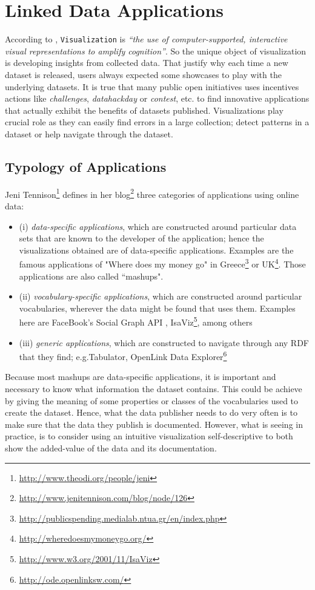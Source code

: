 \section{Linked Data Applications} \label{sec:apps}
According to \cite{card99}, \texttt{Visualization} is \textit{ ``the use of computer-supported, interactive visual representations to amplify cognition''}. So the unique object of visualization is developing insights from collected data. That justify why each time a new dataset is released, users always expected some showcases to play with the underlying datasets. It is true that many public open initiatives uses incentives actions like \textit{challenges}, \textit{datahackday} or \textit{contest}, etc. to find innovative applications that actually exhibit the benefits of datasets published. Visualizations play crucial role as they can easily find errors in a large collection; detect patterns in a dataset or help navigate through the dataset. 

\subsection{Typology of Applications}
Jeni Tennison\footnote{\url{http://www.theodi.org/people/jeni}} defines  in her blog\footnote{\url{http://www.jenitennison.com/blog/node/126}} three categories of applications using online data:
\begin{itemize}
\item (i) \textit{data-specific applications}, which are constructed around particular data sets that are known to the developer of the application; hence the visualizations obtained are of data-specific applications. Examples are the famous applications of "Where does my money go"  in Greece\footnote{\url{http://publicspending.medialab.ntua.gr/en/index.php}} or UK\footnote{\url{http://wheredoesmymoneygo.org/}}. Those applications are also called ``mashups". 
\item (ii) \textit{vocabulary-specific applications}, which are constructed around particular vocabularies, wherever the data might be found that uses them. Examples here are FaceBook’s Social Graph API , IsaViz\footnote{\url{http://www.w3.org/2001/11/IsaViz}}, among others
\item (iii) \textit{generic applications}, which are constructed to navigate through any RDF that they find; e.g.Tabulator\cite{tabulator06}, OpenLink Data Explorer\footnote{\url{http://ode.openlinksw.com/}}

\end{itemize}
Because most mashups are data-specific applications, it is important and necessary to  know what information the dataset contains. This could be achieve by giving the meaning of some properties or classes of the vocabularies used to create the dataset. Hence, what the data publisher needs to do very often is to make sure that the data they publish is documented. However, what is seeing in practice, is to consider using an intuitive visualization self-descriptive to both show the added-value of the data and its documentation.

